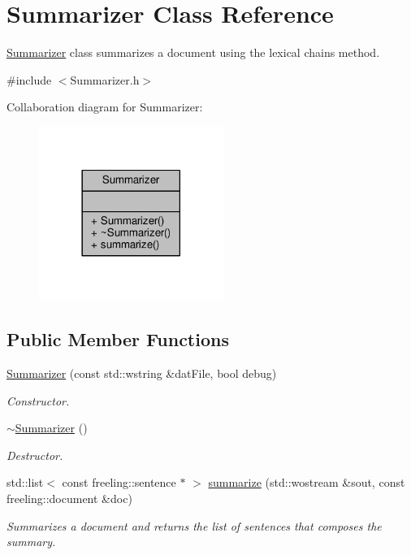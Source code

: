 \hypertarget{classSummarizer}{}\section{Summarizer Class Reference}
\label{classSummarizer}


\hyperlink{classSummarizer}{Summarizer} class summarizes a document using the lexical chains method.  




{\ttfamily \#include $<$Summarizer.\+h$>$}



Collaboration diagram for Summarizer\+:
\nopagebreak
\begin{figure}[H]
\begin{center}
\leavevmode
\includegraphics[width=170pt]{classSummarizer__coll__graph}
\end{center}
\end{figure}
\subsection*{Public Member Functions}
\begin{DoxyCompactItemize}
\item 
\hyperlink{classSummarizer_ae24d5afc2f3c61a287379e2b614726ac}{Summarizer} (const std\+::wstring \&dat\+File, bool debug)
\begin{DoxyCompactList}\small\item\em Constructor. \end{DoxyCompactList}\item 
\hyperlink{classSummarizer_a787d7b2274aeb313acd19d150437d4f5}{$\sim$\+Summarizer} ()
\begin{DoxyCompactList}\small\item\em Destructor. \end{DoxyCompactList}\item 
std\+::list$<$ const freeling\+::sentence $\ast$ $>$ \hyperlink{classSummarizer_a70a36036e96b1b03175c3f1fdde9d0e1}{summarize} (std\+::wostream \&sout, const freeling\+::document \&doc)
\begin{DoxyCompactList}\small\item\em Summarizes a document and returns the list of sentences that composes the summary. \end{DoxyCompactList}\end{DoxyCompactItemize}


